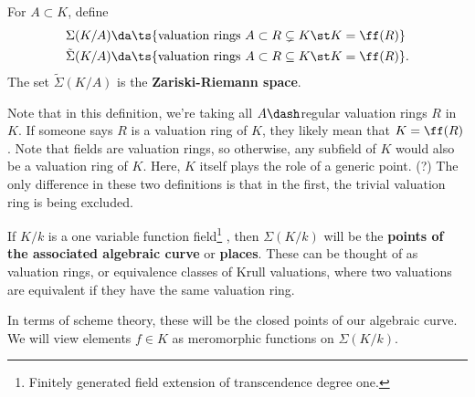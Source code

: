 \begin{definition}

For \(A \subset K\), define
\begin{align*}  
\Sigma(K/A) &\da \ts{\text{valuation rings } A \subset R \subsetneq K \st K = \ff(R)} \\
\tilde \Sigma(K/A) &\da \ts{\text{valuation rings } A \subset R \subseteq K \st K = \ff(R)}
.\end{align*} The set \(\tilde \Sigma(K/A)\) is the
\textbf{Zariski-Riemann space}.

\end{definition}

\begin{remark}

Note that in this definition, we're taking all \(A\dash\)regular
valuation rings \(R\) in \(K\). If someone says \(R\) is a valuation
ring of \(K\), they likely mean that \(K = \ff(R)\). Note that fields
are valuation rings, so otherwise, any subfield of \(K\) would also be a
valuation ring of \(K\). Here, \(K\) itself plays the role of a generic
point. (?) The only difference in these two definitions is that in the
first, the trivial valuation ring is being excluded.

\end{remark}

\begin{definition}

If \(K/k\) is a one variable function field\footnote{Finitely generated
  field extension of transcendence degree one.} , then \(\Sigma(K/k)\)
will be the \textbf{points of the associated algebraic curve} or
\textbf{places}. These can be thought of as valuation rings, or
equivalence classes of Krull valuations, where two valuations are
equivalent if they have the same valuation ring.

\end{definition}

\begin{remark}

In terms of scheme theory, these will be the closed points of our
algebraic curve. We will view elements \(f\in K\) as meromorphic
functions on \(\Sigma(K/k)\).

\end{remark}


